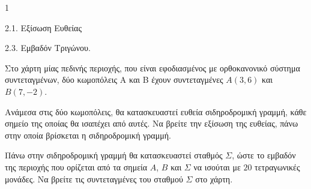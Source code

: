 \begin{ylh}{1}
    \item 2.1. Εξίσωση Ευθείας
    \item 2.3. Εμβαδόν Τριγώνου.
\end{ylh}
Στο χάρτη μίας πεδινής περιοχής, που είναι εφοδιασμένος με ορθοκανονικό σύστημα συντεταγμένων, δύο κωμοπόλεις A και B έχουν συντεταγμένες $A(3,6)$ και $B(7,-2)$.
\begin{alist}
\item Ανάμεσα στις δύο κωμοπόλεις, θα κατασκευαστεί ευθεία σιδηροδρομική γραμμή, κάθε σημείο της οποίας θα ισαπέχει από αυτές. Να βρείτε την εξίσωση της ευθείας, πάνω στην οποία βρίσκεται η σιδηροδρομική γραμμή. 
\item Πάνω στην σιδηροδρομική γραμμή θα κατασκευαστεί σταθμός $\Sigma$, ώστε το εμβαδόν της περιοχής που ορίζεται από τα σημεία $A$, $B$ και $\Sigma$ να ισούται με $20$ τετραγωνικές μονάδες. Να βρείτε τις συντεταγμένες του σταθμού $\Sigma$ στο χάρτη. 
\end{alist}